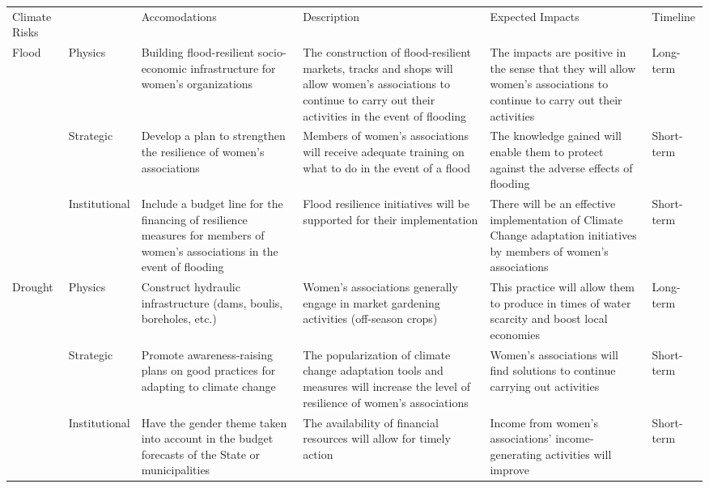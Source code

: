 \documentclass[
]{book}
\begin{document}
\begin{tabular}{>{\raggedright\arraybackslash}p{30em}|>{\raggedright\arraybackslash}p{30em}|>{\raggedright\arraybackslash}p{30em}|>{\raggedright\arraybackslash}p{30em}|>{\raggedright\arraybackslash}p{30em}|>{\raggedright\arraybackslash}p{30em}}
\hline
\multicolumn{6}{c}{Table 13 : Synthesis of adaptation measures and their impacts in the Gender theme} \\
\cline{1-6}
Climate Risks &   & Accomodations & Description & Expected Impacts & Timeline\\
\hline
Flood & Physics & Building flood-resilient socio-economic infrastructure for women's organizations & The construction of flood-resilient markets, tracks and shops will allow women's associations to continue to carry out their activities in the event of flooding & The impacts are positive in the sense that they will allow women's associations to continue to carry out their activities & Long-term\\
\hline
 & Strategic & Develop a plan to strengthen the resilience of women's associations & Members of women's associations will receive adequate training on what to do in the event of a flood & The knowledge gained will enable them to protect against the adverse effects of flooding & Short-term\\
\hline
 & Institutional & Include a budget line for the financing of resilience measures for members of women's associations in the event of flooding & Flood resilience initiatives will be supported for their implementation & There will be an effective implementation of Climate Change adaptation initiatives by members of women's associations & Short-term\\
\hline
Drought & Physics & Construct hydraulic infrastructure (dams, boulis, boreholes, etc.) & Women's associations generally engage in market gardening activities (off-season crops) & This practice will allow them to produce in times of water scarcity and boost local economies & Long-term\\
\hline
 & Strategic & Promote awareness-raising plans on good practices for adapting to climate change & The popularization of climate change adaptation tools and measures will increase the level of resilience of women's associations & Women's associations will find solutions to continue carrying out activities & Short-term\\
\hline
 & Institutional & Have the gender theme taken into account in the budget forecasts of the State or municipalities & The availability of financial resources will allow for timely action & Income from women's associations' income-generating activities will improve & Short-term\\

\end{tabular}
\end{document}

